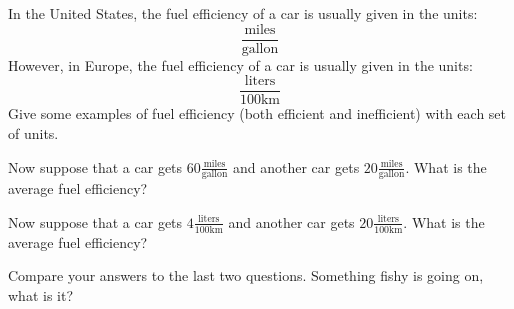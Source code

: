 \documentclass[nooutcomes]{ximera}
\begin{document}
\begin{question}
In the United States, the fuel efficiency of a car is usually given in
the units:
\[
\frac{\text{miles}}{\text{gallon}}
\]
However, in Europe, the fuel efficiency of a car is usually given in
the units:
\[
\frac{\text{liters}}{100 \mathrm{km}}
\]
Give some examples of fuel efficiency (both efficient and
inefficient) with each set of units.
\end{question}


\begin{question}
Now suppose that a car gets $60\frac{\text{miles}}{\text{gallon}}$ and
another car gets $20\frac{\text{miles}}{\text{gallon}}$. What is the
average fuel efficiency?
\end{question}


\begin{question}
Now suppose that a car gets $4\frac{\text{liters}}{100 \mathrm{km}} $
and another car gets $20\frac{\text{liters}}{100 \mathrm{km}}$. What
is the average fuel efficiency?
\end{question}


\begin{exploration}
Compare your answers to the last two questions. Something fishy is
going on, what is it?
\end{exploration}
\end{document}
